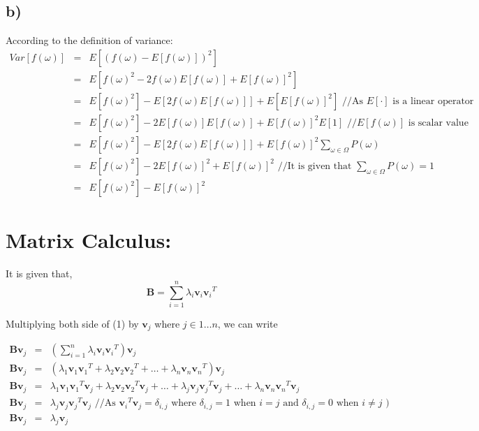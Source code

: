 \documentclass{article}
\renewcommand{\vec}[1]{\mathbf{#1}}
\begin{document}
\begin{scriptsize}
\subsection*{b)}
According to the definition of variance:
\begin{eqnarray*}
Var[f(\omega)] &=& E[(f(\omega) - E[f(\omega)])^2]\\
&=& E[f(\omega)^2 - 2f(\omega)E[f(\omega)] + E[f(\omega)]^2]\\
&=& E[f(\omega)^2] - E[2f(\omega)E[f(\omega)]] + E[E[f(\omega)]^2] \text{				//As $E[\cdot]$ is a linear operator}\\
&=& E[f(\omega)^2] - 2E[f(\omega)]E[f(\omega)] + E[f(\omega)]^2E[1] \text{				//$E[f(\omega)]$ is scalar value}\\
&=& E[f(\omega)^2] - E[2f(\omega)E[f(\omega)]] + E[f(\omega)]^2\sum_{\omega \in \Omega}P(\omega)\\
&=& E[f(\omega)^2] - 2E[f(\omega)]^2 + E[f(\omega)]^2 \text{				//It is given that $\sum_{\omega \in \Omega}P(\omega) = 1$ }\\
&=& E[f(\omega)^2] - E[f(\omega)]^2
\end{eqnarray*}


\section{Matrix Calculus:}

It is given that,
\begin{equation}
\vec{B} = \sum_{i=1}^n \lambda_i\vec{v}_i{\vec{v}_i}^T
\end{equation}

Multiplying both side of (1) by $\vec{v}_j$ where $j \in 1 \dotso n$, we can write


\begin{eqnarray*}
\vec{B}\vec{v}_j &=& \left(\sum_{i=1}^n \lambda_i\vec{v}_i{\vec{v}_i}^T\right)\vec{v}_j\\
\vec{B}\vec{v}_j &=& (\lambda_1\vec{v}_1{\vec{v}_1}^T + \lambda_2\vec{v}_2{\vec{v}_2}^T+\dotso + \lambda_n\vec{v}_n{\vec{v}_n}^T)\vec{v}_j\\
\vec{B}\vec{v}_j &=& \lambda_1\vec{v}_1{\vec{v}_1}^T\vec{v}_j +  \lambda_2\vec{v}_2{\vec{v}_2}^T\vec{v}_j+ \dotso + \lambda_j\vec{v}_j{\vec{v}_j}^T\vec{v}_j + \dotso + \lambda_n\vec{v}_n{\vec{v}_n}^T\vec{v}_j\\
\vec{B}\vec{v}_j &=& \lambda_j\vec{v}_j{\vec{v}_j}^T\vec{v}_j \text{	//As ${\vec{v}_i}^T\vec{v}_j=\delta_{i,j}$ where $\delta_{i,j} = 1$ when $i = j$ and $\delta_{i,j} = 0$ when $i \neq j$ )}\\
\vec{B}\vec{v}_j &=& \lambda_j\vec{v}_j
\end{eqnarray*}


\end{scriptsize}
\end{document}

